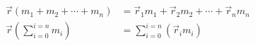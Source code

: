\begin{align*}
\vec{r} \left( m_1 + m_2 + \cdots + m_n \right) &= \vec{r}_1m_1 + \vec{r}_2m_2 + \cdots + \vec{r}_nm_n\\[4mm]
\vec{r}\left(\sum_{i=0}^{i=n} m_i\right)  &= \sum_{i=0}^{i=n} (\vec{r}_i m_i )\\[5mm]
\end{align*}
